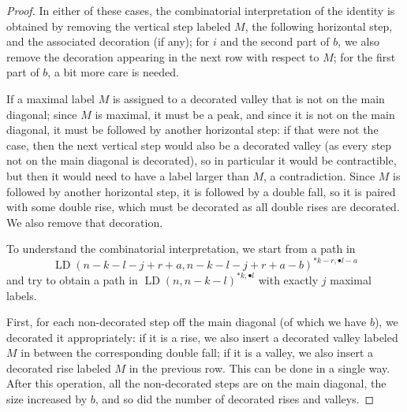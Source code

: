 \documentclass[reqno]{amsart}
\theoremstyle{plain}
\theoremstyle{definition}
\theoremstyle{remark}
\DeclareMathOperator{\LD}{LD}
\newcommand{\<}{\langle}
\renewcommand{\>}{\rangle}
\begin{document}
\begin{proof}
    In either of these cases, the combinatorial interpretation of the identity is obtained by removing the vertical step labeled $M$, the following horizontal step, and the associated decoration (if any); for $i$ and the second part of $b$, we also remove the decoration appearing in the next row with respect to $M$; for the first part of $b$, a bit more care is needed.

    If a maximal label $M$ is assigned to a decorated valley that is not on the main diagonal; since $M$ is maximal, it must be a peak, and since it is not on the main diagonal, it must be followed by another horizontal step: if that were not the case, then the next vertical step would also be a decorated valley (as every step not on the main diagonal is decorated), so in particular it would be contractible, but then it would need to have a label larger than $M$, a contradiction. Since $M$ is followed by another horizontal step, it is followed by a double fall, so it is paired with some double rise, which must be decorated as all double rises are decorated. We also remove that decoration.

    To understand the combinatorial interpretation, we start from a path in \[ \LD(n-k-l-j+r+a, n-k-l-j+r+a-b)^{\ast k-r, \bullet l-a} \] and try to obtain a path in $\LD(n, n-k-l)^{\ast k, \bullet l}$ with exactly $j$ maximal labels.
    
    First, for each non-decorated step off the main diagonal (of which we have $b$), we decorated it appropriately: if it is a rise, we also insert a decorated valley labeled $M$ in between the corresponding double fall; if it is a valley, we also insert a decorated rise labeled $M$ in the previous row. This can be done in a single way. After this operation, all the non-decorated steps are on the main diagonal, the size increased by $b$, and so did the number of decorated rises and valleys.


\end{proof}
\end{document}
